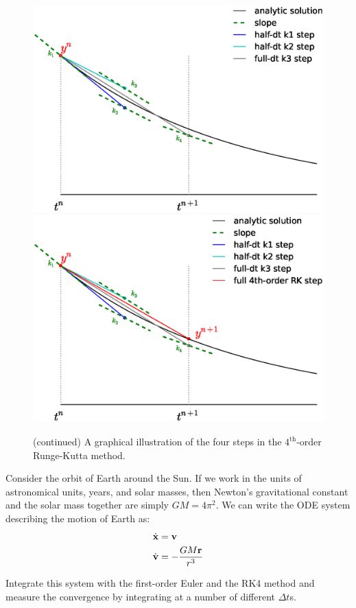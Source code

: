 \begin{figure}[t]
\ContinuedFloat
\centering
\includegraphics[width=0.65\linewidth]{rk4_k4.eps} \\
\includegraphics[width=0.7\linewidth]{rk4_final.eps} \\
%
\caption[$4^\mathrm{th}$-order Runge-Kutta continued] {\label{fig:rk}
  (continued) A graphical illustration of the four steps in the
  $4^\mathrm{th}$-order Runge-Kutta method.}
\end{figure}

\begin{exercise}
Consider the orbit of Earth around the Sun.  If we work in the units
of astronomical units, years, and solar masses, then Newton's gravitational
constant and the solar mass together are simply $G M = 4\pi^2$.  We 
can write the ODE system describing the motion of Earth as:
\begin{align}
\dot{\bf x} &= {\bf v} \\
\dot{\bf v} &= -\frac{G M {\bf r}}{r^3}
\end{align}

Integrate this system with the first-order Euler and the RK4 method
and measure the convergence by integrating at a number of different $\Delta t$s.
\end{exercise}


